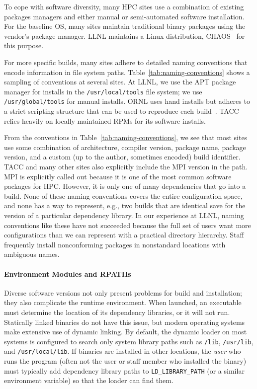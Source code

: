 To cope with software diversity, many HPC sites use a combination of existing
packages managers and either manual or semi-automated software installation.  
For the baseline OS, many sites maintain traditional binary
packages using the vendor's package manager. LLNL maintains a Linux 
distribution, CHAOS~\cite{chaos} for this purpose.

For more specific builds, many sites adhere to detailed naming conventions
that encode information in file system paths. 
Table~\ref{tab:naming-conventions} shows a sampling of conventions
at several sites. At LLNL, we use the APT package manager for installs 
in the {\tt /usr/local/tools} file system; we use {\tt /usr/global/tools} 
for manual installs.
ORNL uses hand installs but adheres to a strict scripting structure
that can be used to reproduce each build~\cite{jones+:cug08}.
TACC relies heavily on locally maintained RPMs for its software installs.

From the conventions in Table~\ref{tab:naming-conventions},
we see that most sites use some combination of architecture, compiler version,
package name, package version, and a custom (up to the author, sometimes
encoded) build identifier.  TACC and many other sites also explicitly
include the MPI version in the path. MPI is explicitly called out
because it is one of the most common software packages for HPC.
However, it is only one of many dependencies that go into a build.
None of these naming conventions covers the entire configuration
space, and none has a way to represent, e.g., two builds that are identical
save for the version of a particular dependency library.  In our experience
at LLNL, naming conventions like these have not succeeded because the full
set of users want more configurations than we can represent with a practical
directory hierarchy. Staff frequently install nonconforming packages 
in nonstandard locations with ambiguous names.

\paragraph{Environment Modules and RPATHs}

Diverse software versions not only present problems for build and installation;
they also complicate the runtime environment. When launched, an executable
must determine the location of its dependency libraries, or it will not run.
Statically linked binaries do not have this issue, but modern
operating systems make extensive use of dynamic linking.
By default, the dynamic loader on most systems is configured to search only
system library paths such as {\tt /lib}, {\tt /usr/lib}, and
{\tt /usr/local/lib}.  If binaries are installed in other locations, the
{\it user} who runs the program (often not the user or staff member who
installed the binary) must typically add dependency library paths to
{\tt LD\_LIBRARY\_PATH} (or a similar environment variable) so that the loader
can find them.


